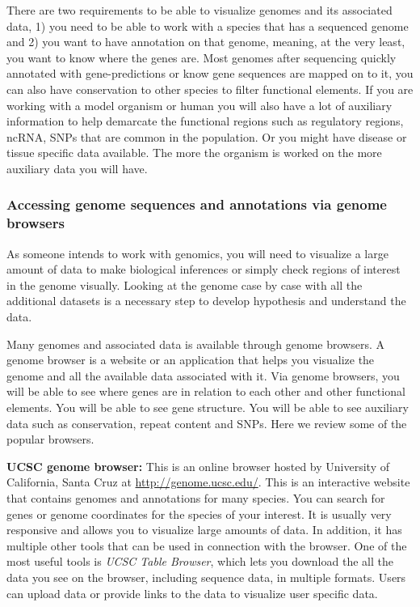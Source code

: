 \documentclass[12pt,]{krantz}
\begin{document}
There are two requirements to be able to visualize genomes and its associated
data, 1) you need to be able to work with a species
that has a sequenced genome and 2) you want to have annotation on that genome,
meaning, at the very least, you want to know where the genes are. Most
genomes after sequencing quickly annotated with gene-predictions or
know gene sequences are mapped on to it, you can also
have conservation to other species to filter functional elements. If you
are working with a model organism or human you will also have a lot of
auxiliary information to help demarcate the functional regions such
as regulatory regions, ncRNA, SNPs that are common in the population.
Or you might have disease or tissue specific data available.
The more the organism is worked on the more auxiliary data you will have.

\hypertarget{accessing-genome-sequences-and-annotations-via-genome-browsers}{%
\subsubsection{Accessing genome sequences and annotations via genome browsers}\label{accessing-genome-sequences-and-annotations-via-genome-browsers}}

As someone intends to work with genomics, you will need to visualize a
large amount of data to make biological inferences or simply check regions of
interest in the genome visually. Looking at the genome case by case with all
the additional datasets is a necessary step to develop hypothesis and understand
the data.

Many genomes and associated data is
available through genome browsers. A genome browser
is a website or an application
that helps you visualize the genome and all the available data associated
with it. Via genome browsers, you will be able to see where genes are in
relation to each other and other functional elements. You will be
able to see gene structure. You will be able to see auxiliary data such as
conservation, repeat content and SNPs. Here we review some of the popular
browsers.

\textbf{UCSC genome browser:} This is an online browser hosted by University of
California, Santa Cruz at \url{http://genome.ucsc.edu/}.
This is an interactive website that contains genomes
and annotations for many species. You can search for genes or genome coordinates
for the species of your interest. It is usually very responsive and allows
you to visualize large amounts of data. In addition, it has multiple other tools
that can be used in connection with the browser. One of the most useful tools
is \emph{UCSC Table Browser}, which lets you download the all the data you see on the
browser, including sequence data, in multiple formats.
Users can upload data or provide links to the data
to visualize user specific data.
\end{document}
